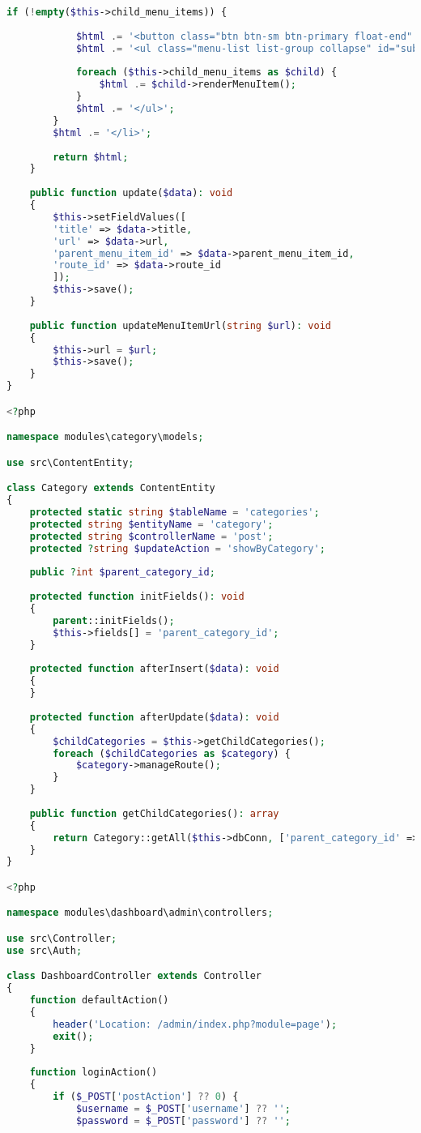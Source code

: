 \begin{lstlisting}[language=PHP, frame=none]
		if (!empty($this->child_menu_items)) {
			
			$html .= '<button class="btn btn-sm btn-primary float-end" data-bs-toggle="collapse" data-bs-target="#submenu' . $this->id . '">Подробнее</button>';
			$html .= '<ul class="menu-list list-group collapse" id="submenu' . $this->id . '">';
			
			foreach ($this->child_menu_items as $child) {
				$html .= $child->renderMenuItem();
			}
			$html .= '</ul>';
		}
		$html .= '</li>';
		
		return $html;
	}
	
	public function update($data): void
	{
		$this->setFieldValues([
		'title' => $data->title,
		'url' => $data->url,
		'parent_menu_item_id' => $data->parent_menu_item_id,
		'route_id' => $data->route_id
		]);
		$this->save();
	}
	
	public function updateMenuItemUrl(string $url): void
	{
		$this->url = $url;
		$this->save();
	}
}

<?php

namespace modules\category\models;

use src\ContentEntity;

class Category extends ContentEntity
{
	protected static string $tableName = 'categories';
	protected string $entityName = 'category';
	protected string $controllerName = 'post';
	protected ?string $updateAction = 'showByCategory';
	
	public ?int $parent_category_id;
	
	protected function initFields(): void
	{
		parent::initFields();
		$this->fields[] = 'parent_category_id';
	}
	
	protected function afterInsert($data): void
	{
	}
	
	protected function afterUpdate($data): void
	{
		$childCategories = $this->getChildCategories();
		foreach ($childCategories as $category) {
			$category->manageRoute();
		}
	}
	
	public function getChildCategories(): array
	{
		return Category::getAll($this->dbConn, ['parent_category_id' => $this->id]);
	}
}

<?php

namespace modules\dashboard\admin\controllers;

use src\Controller;
use src\Auth;

class DashboardController extends Controller
{
	function defaultAction()
	{
		header('Location: /admin/index.php?module=page');
		exit();
	}
	
	function loginAction()
	{
		if ($_POST['postAction'] ?? 0) {
			$username = $_POST['username'] ?? '';
			$password = $_POST['password'] ?? '';
			

\end{lstlisting}
